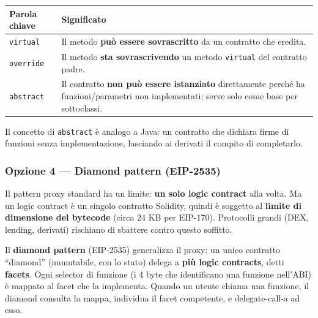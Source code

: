 \documentclass[
  italian,
  openany]{book}
\newcounter{none} %
\begin{document}
{\def\LTcaptype{none} %
\begin{longtable}[]{@{}
  >{\raggedright\arraybackslash}p{}
  >{\raggedright\arraybackslash}p{}@{}}
\toprule\noalign{}
\begin{minipage}[b]{\linewidth}\raggedright
Parola chiave
\end{minipage} & \begin{minipage}[b]{\linewidth}\raggedright
Significato
\end{minipage} \\
\midrule\noalign{}
\endhead
\bottomrule\noalign{}
\endlastfoot
\texttt{virtual} & Il metodo \textbf{può essere sovrascritto} da un
contratto che eredita. \\
\texttt{override} & Il metodo \textbf{sta sovrascrivendo} un metodo
\texttt{virtual} del contratto padre. \\
\texttt{abstract} & Il contratto \textbf{non può essere istanziato}
direttamente perché ha funzioni/parametri non implementati; serve solo
come base per sottoclassi. \\
\end{longtable}
}

Il concetto di \texttt{abstract} è analogo a Java: un contratto che
dichiara firme di funzioni senza implementazione, lasciando ai derivati
il compito di completarlo.

\subsubsection{Opzione 4 --- Diamond pattern
(EIP-2535)}\label{opzione-4-diamond-pattern-eip-2535}

Il pattern proxy standard ha un limite: \textbf{un solo logic contract}
alla volta. Ma un logic contract è un singolo contratto Solidity, quindi
è soggetto al \textbf{limite di dimensione del bytecode} (circa 24 KB
per EIP-170). Protocolli grandi (DEX, lending, derivati) rischiano di
sbattere contro questo soffitto.

Il \textbf{diamond pattern} (EIP-2535) generalizza il proxy: un unico
contratto ``diamond'' (immutabile, con lo stato) delega a \textbf{più
logic contracts}, detti \textbf{facets}. Ogni selector di funzione (i 4
byte che identificano una funzione nell'ABI) è mappato al facet che la
implementa. Quando un utente chiama una funzione, il diamond consulta la
mappa, individua il facet competente, e delegate-call-a ad esso.
\end{document}
